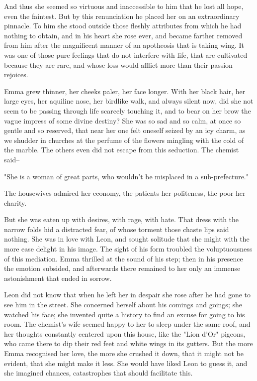 \documentclass[11pt,twocolumn]{ltugboat}
\begin{document}
And thus she seemed so virtuous and inaccessible to him that he lost all
hope, even the faintest. But by this renunciation he placed her on
an extraordinary pinnacle. To him she stood outside those fleshly
attributes from which he had nothing to obtain, and in his heart she
rose ever, and became farther removed from him after the magnificent
manner of an apotheosis that is taking wing. It was one of those pure
feelings that do not interfere with life, that are cultivated because
they are rare, and whose loss would afflict more than their passion
rejoices.

Emma grew thinner, her cheeks paler, her face longer. With her black
hair, her large eyes, her aquiline nose, her birdlike walk, and always
silent now, did she not seem to be passing through life scarcely
touching it, and to bear on her brow the vague impress of some divine
destiny? She was so sad and so calm, at once so gentle and so reserved,
that near her one felt oneself seized by an icy charm, as we shudder
in churches at the perfume of the flowers mingling with the cold of the
marble. The others even did not escape from this seduction. The chemist
said--

"She is a woman of great parts, who wouldn't be misplaced in a
sub-prefecture."

The housewives admired her economy, the patients her politeness, the
poor her charity.

But she was eaten up with desires, with rage, with hate. That dress with
the narrow folds hid a distracted fear, of whose torment those chaste
lips said nothing. She was in love with Leon, and sought solitude that
she might with the more ease delight in his image. The sight of his
form troubled the voluptuousness of this mediation. Emma thrilled at
the sound of his step; then in his presence the emotion subsided, and
afterwards there remained to her only an immense astonishment that ended
in sorrow.

Leon did not know that when he left her in despair she rose after he had
gone to see him in the street. She concerned herself about his comings
and goings; she watched his face; she invented quite a history to find
an excuse for going to his room. The chemist's wife seemed happy to her
to sleep under the same roof, and her thoughts constantly centered upon
this house, like the "Lion d'Or" pigeons, who came there to dip their
red feet and white wings in its gutters. But the more Emma recognised
her love, the more she crushed it down, that it might not be evident,
that she might make it less. She would have liked Leon to guess it, and
she imagined chances, catastrophes that should facilitate this.
\end{document}
